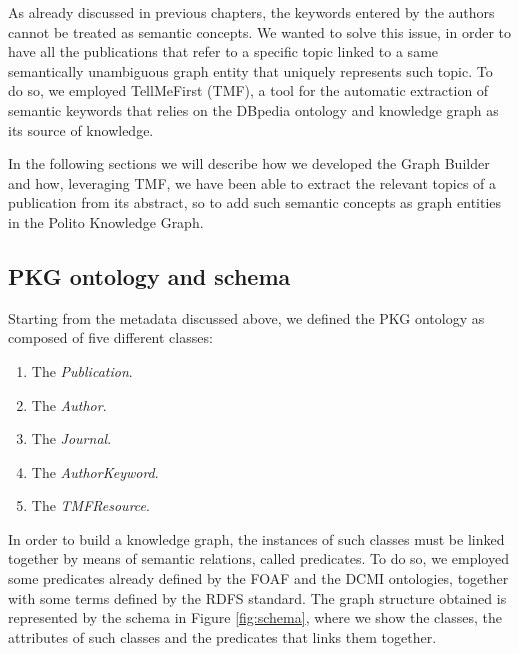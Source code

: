 \documentclass[%
    corpo=13.5pt,
    twoside,
    oldstyle,
    tipotesi=magistrale,
    greek,
    evenboxes
]{toptesi}
\begin{document}
As already discussed in previous chapters, the keywords entered by the authors
cannot be treated as semantic concepts. We wanted to solve this issue, in order
to have all the publications that refer to a specific topic linked to a
same semantically unambiguous graph entity that uniquely represents such topic.
To do so, we employed TellMeFirst (TMF), a tool for the automatic extraction of
semantic keywords that relies on the DBpedia ontology and knowledge graph as
its source of knowledge.

In the following sections we will describe how we developed the Graph Builder
and how, leveraging TMF, we have been able to extract the relevant topics of a
publication from its abstract, so to add such semantic concepts as graph
entities in the Polito Knowledge Graph.

\subsection{PKG ontology and schema}

Starting from the metadata discussed above, we defined
the PKG ontology as composed of five different classes:

\begin{enumerate}
    \item The \emph{Publication}.
    \item The \emph{Author}.
    \item The \emph{Journal}.
    \item The \emph{AuthorKeyword}.
    \item The \emph{TMFResource}.
\end{enumerate}

In order to build a knowledge graph, the instances of such classes must be
linked together by means of semantic relations, called predicates.
To do so, we employed some predicates already defined by the
FOAF\cite{brickley2007} and the DCMI\cite{weibel1998} ontologies, together with
some terms defined by the RDFS\cite{lassila1998} standard.
The graph structure obtained is represented by the schema in
Figure \ref{fig:schema}, where we show the classes, the attributes of such
classes and the predicates that links them together.
\end{document}

